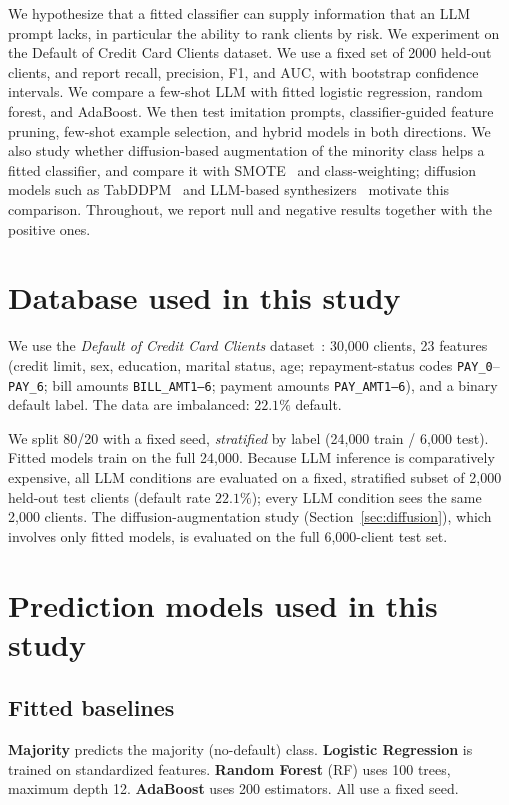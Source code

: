 \documentclass[conference]{IEEEtran}
\begin{document}
We hypothesize that a fitted classifier can supply information that an LLM prompt lacks, in particular the ability to rank clients by risk. We experiment on the Default of Credit Card Clients dataset. We use a fixed set of 2000 held-out clients, and report recall, precision, F1, and AUC, with bootstrap confidence intervals. We compare a few-shot LLM with fitted logistic regression, random forest, and AdaBoost. We then test imitation prompts, classifier-guided feature pruning, few-shot example selection, and hybrid models in both directions. We also study whether diffusion-based augmentation of the minority class helps a fitted classifier, and compare it with SMOTE~\cite{chawla2002smote} and class-weighting; diffusion models such as TabDDPM~\cite{kotelnikov2023tabddpm} and LLM-based synthesizers~\cite{kim2024epic} motivate this comparison. Throughout, we report null and negative results together with the positive ones.

\section{Database used in this study}
We use the \textit{Default of Credit Card Clients} dataset~\cite{yeh2009comparative}: 30{,}000 clients, 23 features (credit limit, sex, education, marital status, age; repayment-status codes \texttt{PAY\_0}--\texttt{PAY\_6}; bill amounts \texttt{BILL\_AMT1--6}; payment amounts \texttt{PAY\_AMT1--6}), and a binary default label. The data are imbalanced: $22.1\%$ default.

We split 80/20 with a fixed seed, \emph{stratified} by label (24{,}000 train / 6{,}000 test). Fitted models train on the full 24{,}000. Because LLM inference is comparatively expensive, all LLM conditions are evaluated on a fixed, stratified subset of 2{,}000 held-out test clients (default rate $22.1\%$); every LLM condition sees the same 2{,}000 clients. The diffusion-augmentation study (Section~\ref{sec:diffusion}), which involves only fitted models, is evaluated on the full 6{,}000-client test set.

\section{Prediction models used in this study}

\subsection{Fitted baselines}
\textbf{Majority} predicts the majority (no-default) class. \textbf{Logistic Regression} is trained on standardized features. \textbf{Random Forest} (RF) uses 100 trees, maximum depth 12. \textbf{AdaBoost} uses 200 estimators. All use a fixed seed.
\end{document}

